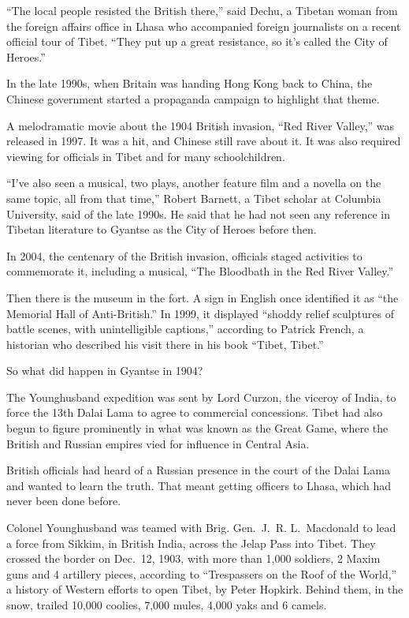 ﻿\documentclass[12pt]{article}
\begin{document}
``The local people resisted the British there,'' said Dechu, a Tibetan woman from the foreign
affairs office in Lhasa who accompanied foreign journalists on a recent official tour of Tibet.
``They put up a great resistance, so it's called the City of Heroes.''

In the late 1990s, when Britain was handing Hong Kong back to China, the Chinese government started
a propaganda campaign to highlight that theme.

A melodramatic movie about the 1904 British invasion, ``Red River Valley,'' was released in 1997. It
was a hit, and Chinese still rave about it. It was also required viewing for officials in Tibet and
for many schoolchildren.

``I've also seen a musical, two plays, another feature film and a novella on the same topic, all
from that time,'' Robert Barnett, a Tibet scholar at Columbia University, said of the late 1990s. He
said that he had not seen any reference in Tibetan literature to Gyantse as the City of Heroes
before then.

In 2004, the centenary of the British invasion, officials staged activities to commemorate it,
including a musical, ``The Bloodbath in the Red River Valley.''

Then there is the museum in the fort. A sign in English once identified it as ``the Memorial Hall of
Anti-British.'' In 1999, it displayed ``shoddy relief sculptures of battle scenes, with
unintelligible captions,'' according to Patrick French, a historian who described his visit there in
his book ``Tibet, Tibet.''

So what did happen in Gyantse in 1904?

The Younghusband expedition was sent by Lord Curzon, the viceroy of India, to force the 13th Dalai
Lama to agree to commercial concessions. Tibet had also begun to figure prominently in what was
known as the Great Game, where the British and Russian empires vied for influence in Central Asia.

British officials had heard of a Russian presence in the court of the Dalai Lama and wanted to learn
the truth. That meant getting officers to Lhasa, which had never been done before.

Colonel Younghusband was teamed with Brig. Gen.~J.~R. L.~Macdonald to lead a force from Sikkim, in
British India, across the Jelap Pass into Tibet. They crossed the border on Dec.~12, 1903, with more
than 1,000 soldiers, 2 Maxim guns and 4 artillery pieces, according to ``Trespassers on the Roof of
the World,'' a history of Western efforts to open Tibet, by Peter Hopkirk. Behind them, in the snow,
trailed 10,000 coolies, 7,000 mules, 4,000 yaks and 6 camels.
\end{document}
